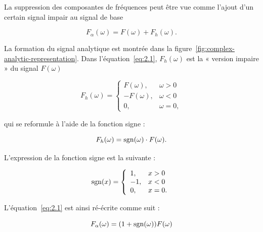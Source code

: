 La suppression des composantes de fréquences peut être vue comme l'ajout d'un certain signal impair au signal de base

\begin{equation} \label{eq:2.1}
    F_{\alpha}(\omega) = F(\omega) + F_h(\omega).
\end{equation}

\noindent La formation du signal analytique est montrée dans la figure~\ref{fig:complex-analytic-representation}. Dans l'équation~\ref{eq:2.1}, $F_h(\omega)$ est la « version impaire » du signal $F(\omega)$

\begin{equation}
    F_h(\omega) = \left\{
    \begin{array}{ll}
        F(\omega), & \omega > 0 \\
        -F(\omega), & \omega < 0 \\
        0, & \omega = 0,
    \end{array}
    \right.
\end{equation}

\noindent qui se reformule à l'aide de la fonction signe :

\begin{equation}
    F_h(\omega) = \operatorname{sgn}(\omega)\cdot F(\omega).
    \label{eq:2.5}
\end{equation}

\noindent L'expression de la fonction signe est la suivante :

\begin{equation}
    \operatorname{sgn}(x) = \left\{
    \begin{array}{ll}
        1, & x > 0 \\
        -1, & x < 0 \\
        0, & x = 0.
    \end{array}
    \right.
\end{equation}

\noindent L'équation~\ref{eq:2.1} est ainsi ré-écrite comme suit :

\begin{equation}
    F_{\alpha}(\omega) = (1+\operatorname{sgn}(\omega))F(\omega)
\end{equation}

\bigskip

